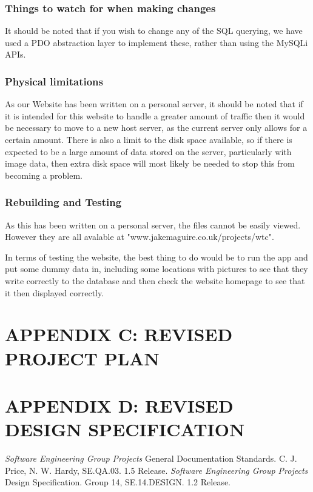 \documentclass{project}
\begin{document}
\subsubsection{Things to watch for when making changes}
It should be noted that if you wish to change any of the SQL querying, we have used a PDO abstraction layer to implement these, rather than using the MySQLi APIs.

\subsubsection{Physical limitations}
As our Website has been written on a personal server, it should be noted that if it is intended for this website to handle a greater amount of traffic then it would be necessary to move to a new host server, as the current server only allows for a certain amount. There is also a limit to the disk space available, so if there is expected to be a large amount of data stored on the server, particularly with image data, then extra disk space will most likely be needed to stop this from becoming a problem.

\subsubsection{Rebuilding and Testing}
As this has been written on a personal server, the files cannot be easily viewed. However they are all avalable at "www.jakemaguire.co.uk/projects/wtc".

In terms of testing the website, the best thing to do would be to run the app and put some dummy data in, including some locations with pictures to see that they write correctly to the database and then check the website homepage to see that it then displayed correctly.

\newpage

\section{APPENDIX C: REVISED PROJECT PLAN}

\newpage

\section{APPENDIX D: REVISED DESIGN SPECIFICATION}

\clearpage

\begin{thebibliography}{5}
 \emph{Software Engineering Group Projects}
General Documentation Standards.
C. J. Price, N. W. Hardy, SE.QA.03. 1.5 Release.
 \emph{Software Engineering Group Projects}
Design Specification.
Group 14, SE.14.DESIGN. 1.2 Release.
\end{thebibliography}
\end{document}
